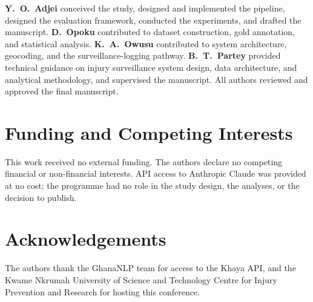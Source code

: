 \documentclass[conference]{IEEEtran}
\begin{document}
\textbf{Y.~O.~Adjei} conceived the study, designed and implemented
the pipeline, designed the evaluation framework, conducted the
experiments, and drafted the manuscript.
\textbf{D.~Opoku} contributed to dataset construction, gold
annotation, and statistical analysis.
\textbf{K.~A.~Owusu} contributed to system architecture, geocoding,
and the surveillance-logging pathway.
\textbf{B.~T.~Partey} provided technical guidance on injury
surveillance system design, data architecture, and analytical
methodology, and supervised the manuscript.
All authors reviewed and approved the final manuscript.


\section*{Funding and Competing Interests}

This work received no external funding. The authors declare no
competing financial or non-financial interests. API access to
Anthropic Claude was provided at no cost; the programme had no role
in the study design, the analyses, or the decision to publish.


\section*{Acknowledgements}

The authors thank the GhanaNLP team for access to the Khaya API, and
the Kwame Nkrumah University of Science and Technology Centre for
Injury Prevention and Research for hosting this conference.
\end{document}
